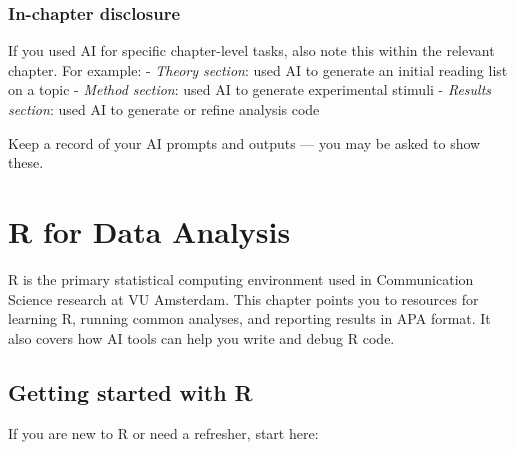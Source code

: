 \documentclass[
  11pt,
  a4paper,
]{scrbook}
\begin{document}
\subsection{In-chapter disclosure}\label{in-chapter-disclosure}

If you used AI for specific chapter-level tasks, also note this within
the relevant chapter. For example: - \emph{Theory section}: used AI to
generate an initial reading list on a topic - \emph{Method section}:
used AI to generate experimental stimuli - \emph{Results section}: used
AI to generate or refine analysis code

Keep a record of your AI prompts and outputs --- you may be asked to
show these.

\chapter{R for Data Analysis}\label{r-for-data-analysis}

R is the primary statistical computing environment used in Communication
Science research at VU Amsterdam. This chapter points you to resources
for learning R, running common analyses, and reporting results in APA
format. It also covers how AI tools can help you write and debug R code.

\section{Getting started with R}\label{getting-started-with-r}

If you are new to R or need a refresher, start here:
\end{document}
